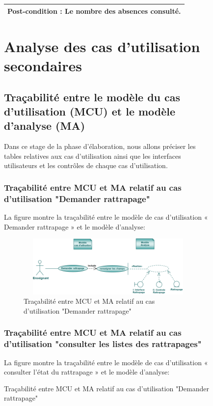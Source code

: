 \documentclass[12 pt]{report}
\begin{document}
\begin{figure}[h]
\begin{center}
\begin{table}[htbp]
\begin{center}
\begin{tabular}{|p{17 cm}|}
 \\
 \hline
 \cellcolor{MistyRose}  \textbf{Post-condition :} Le nombre des absences consulté.\\
 \hline
 
\end{tabular}
\end{center}
\end{table}


\section{Analyse des cas d’utilisation secondaires }
\subsection{Traçabilité entre le modèle du cas d’utilisation (MCU) et le modèle d’analyse (MA)}
Dans ce stage de la phase d'élaboration, nous allons préciser les tables relatives aux cas d’utilisation ainsi que les interfaces utilisateurs et les contrôles de chaque cas d’utilisation.
\subsubsection{Traçabilité entre MCU et MA relatif au cas d’utilisation "Demander rattrapage" }
La figure  montre la traçabilité entre le modèle de cas d’utilisation « Demander rattrapage » et le modèle d’analyse:

\begin{figure}[h]
\begin{center}
\includegraphics[width= 12cm , height =3cm]{tdr.PNG}
\caption{Traçabilité entre MCU et MA relatif au cas d’utilisation "Demander rattrapage"}
\end{center}
\end{figure} 
\subsubsection{Traçabilité entre MCU et MA relatif au cas d’utilisation "consulter les listes des rattrapages" }
La figure  montre la traçabilité entre le modèle de cas d’utilisation « consulter l'état du rattrapage » et le modèle d’analyse:


\end{center}
\end{figure}
\end{document}

